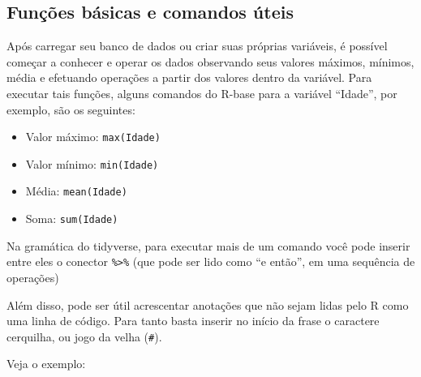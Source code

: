 \documentclass[
  10pt,
  brazil,
  a4paper,
  twoside, notitlepage, openright]{book}
\newenvironment{Shaded}{\begin{snugshade}}{\end{snugshade}}
\newcommand{\CommentTok}[1]{\textcolor[rgb]{0.56,0.35,0.01}{\textit{#1}}}
\newcommand{\DataTypeTok}[1]{\textcolor[rgb]{0.13,0.29,0.53}{#1}}
\newcommand{\KeywordTok}[1]{\textcolor[rgb]{0.13,0.29,0.53}{\textbf{#1}}}
\newcommand{\NormalTok}[1]{#1}
\newcommand{\OperatorTok}[1]{\textcolor[rgb]{0.81,0.36,0.00}{\textbf{#1}}}
\newcommand{\OtherTok}[1]{\textcolor[rgb]{0.56,0.35,0.01}{#1}}
\newcommand{\StringTok}[1]{\textcolor[rgb]{0.31,0.60,0.02}{#1}}
\providecommand{\tightlist}{%
  \setlength{\itemsep}{0pt}\setlength{\parskip}{0pt}}
\begin{document}
\hypertarget{funuxe7uxf5es-buxe1sicas-e-comandos-uxfateis}{%
\subsection{Funções básicas e comandos úteis}\label{funuxe7uxf5es-buxe1sicas-e-comandos-uxfateis}}

Após carregar seu banco de dados ou criar suas próprias variáveis, é possível começar a conhecer e operar os dados observando seus valores máximos, mínimos, média e efetuando operações a partir dos valores dentro da variável. Para executar tais funções, alguns comandos do R-base para a variável ``Idade'', por exemplo, são os seguintes:

\begin{itemize}
\tightlist
\item
  Valor máximo: \texttt{max(Idade)}
\item
  Valor mínimo: \texttt{min(Idade)}
\item
  Média: \texttt{mean(Idade)}
\item
  Soma: \texttt{sum(Idade)}
\end{itemize}

Na gramática do tidyverse, para executar mais de um comando você pode inserir entre eles o conector \texttt{\%\textgreater{}\%} (que pode ser lido como ``e então'', em uma sequência de operações)

Além disso, pode ser útil acrescentar anotações que não sejam lidas pelo R como uma linha de código. Para tanto basta inserir no início da frase o caractere cerquilha, ou jogo da velha (\texttt{\#}).

Veja o exemplo:

\begin{Shaded}
\end{Shaded}
\end{document}
